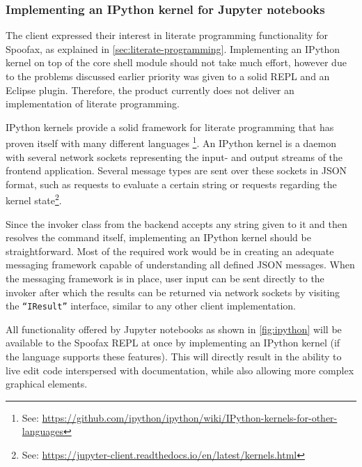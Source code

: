 \subsubsection{Implementing an IPython kernel for Jupyter notebooks}
\label{sec:discuss-literate-programming}

The client expressed their interest in literate programming functionality for
Spoofax, as explained in \cref{sec:literate-programming}. Implementing an
IPython kernel on top of the core shell module should not take much effort,
however due to the problems discussed earlier priority was given to a solid
REPL and an Eclipse plugin. Therefore, the product currently does not deliver an
implementation of literate programming.

IPython kernels provide a solid framework for literate programming that has
proven itself with many different languages%
\footnote{See: \url{https://github.com/ipython/ipython/wiki/IPython-kernels-for-other-languages}}.
An IPython kernel is a daemon with several network sockets
representing the input- and output streams of the frontend application. Several
message types are sent over these sockets in JSON format, such as requests to
evaluate a certain string or requests regarding the kernel
state\footnote{See: \url{https://jupyter-client.readthedocs.io/en/latest/kernels.html}}.

Since the invoker class from the backend accepts any string given to it and then
resolves the command itself, implementing an IPython kernel should be
straightforward. Most of the required work would be in creating an adequate
messaging framework capable of understanding all defined JSON messages. When the
messaging framework is in place, user input can be sent directly to the invoker
after which the results can be returned via network sockets by visiting the
\texttt{``IResult''} interface, similar to any other client implementation.

All functionality offered by Jupyter notebooks as shown in \cref{fig:ipython}
will be available to the Spoofax REPL at once by implementing an IPython kernel
(if the language supports these features). This will directly result in the
ability to live edit code interspersed with documentation, while also allowing
more complex graphical elements.

